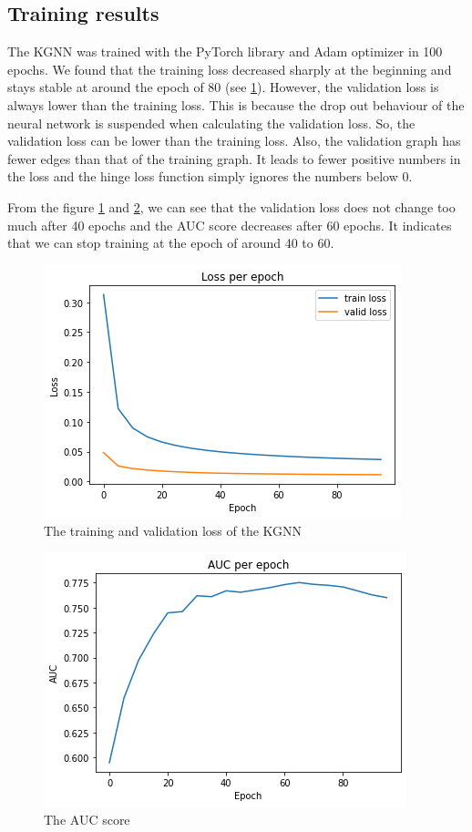 \documentclass[11pt,twoside]{report}
\begin{document}
\subsection{Training results}
The KGNN was trained with the PyTorch library and Adam optimizer in 100 epochs. We found that the training loss decreased sharply at the beginning and stays stable at around the epoch of 80 (see \ref{fig:training_loss}). However, the validation loss is always lower than the training loss. This is because the drop out behaviour of the neural network is suspended when calculating the validation loss. So, the validation loss can be lower than the training loss. Also, the validation graph has fewer edges than that of the training graph. It leads to fewer positive numbers in the loss and the hinge loss function simply ignores the numbers below 0. 

From the figure \ref{fig:training_loss} and \ref{fig:auc}, we can see that the validation loss does not change too much after 40 epochs and the AUC score decreases after 60 epochs. It indicates that we can stop training at the epoch of around 40 to 60.

\begin{figure}[H]
    \centering
    \includegraphics[scale=0.9]{loss.png}
    \caption{The training and validation loss of the KGNN}
    \label{fig:training_loss}
\end{figure}

\begin{figure}[H]
    \centering
    \includegraphics[scale=0.9]{auc.png}
    \caption{The AUC score}
    \label{fig:auc}
\end{figure}
\end{document}

